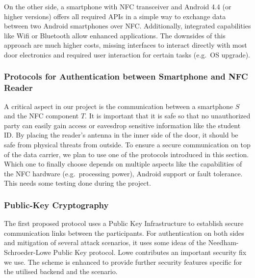 On the other side, a smartphone with NFC transceiver and Android 4.4 (or higher versions) offers all required APIs in a simple way to exchange data between two Android smartphones over NFC.
Additionally, integrated capabilities like Wifi or Bluetooth allow enhanced applications. The downsides of this approach are much higher costs, missing interfaces to interact directly with most door electronics and required user interaction for certain tasks (e.g.~OS upgrade).



\subsubsection{Protocols for Authentication between Smartphone and NFC Reader}\label{sec:alt:proto}
A critical aspect in our project is the communication between a smartphone $ S $ and the NFC component $ T $.
It is important that it is safe so that no unauthorized party can easily gain access or eavesdrop sensitive information like the student ID.
By placing the reader's antenna in the inner side of the door, it should be safe from physical threats from outside.
To ensure a secure communication on top of the data carrier, we plan to use one of the protocols introduced in this section.
Which one to finally choose depends on multiple aspects like the capabilities of the NFC hardware (e.g.~processing power), Android support or fault tolerance. This needs some testing done during the project. 

\subsubsection{Public-Key Cryptography}\label{sec:alt:proto:pubkey}
The first proposed protocol uses a Public Key Infrastructure to establish secure communication links between the participants.
For authentication on both sides and mitigation of several attack scenarios, it uses some ideas of the Needham-Schroeder-Lowe Public Key protocol. Lowe contributes an important security fix we use.
The scheme is enhanced to provide further security features specific for the utilised backend and the scenario.

